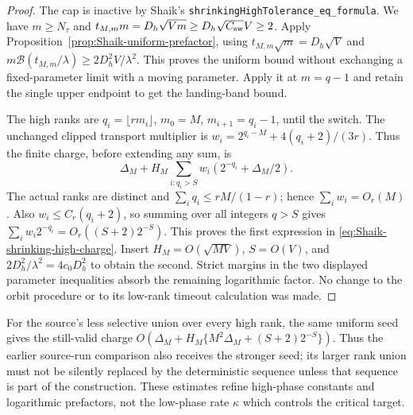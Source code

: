 \begin{proof}
The cap is inactive by Shaik's
\texttt{shrinkingHighTolerance\_eq\_formula}.
We have \(m\ge N_\tau\) and
\(t_{M,m}m=D_h\sqrt{Vm}\ge D_h\sqrt{C_{\rm sw}}V\ge2\).
Apply Proposition~\ref{prop:Shaik-uniform-prefactor}, using
\(t_{M,m}\sqrt m=D_h\sqrt V\) and
\(m\mathcal B(t_{M,m}/\lambda)\ge2D_h^2V/\lambda^2\).
This proves the uniform bound without exchanging a fixed-parameter
limit with a moving parameter. Apply it at \(m=q-1\) and retain the
single upper endpoint to get the landing-band bound.

The high ranks are \(q_i=\lfloor rm_i\rfloor\),
\(m_0=M\), \(m_{i+1}=q_i-1\), until the switch.
The unchanged clipped transport multiplier is
\(w_i=2^{q_i-M}+4(q_i+2)/(3r)\).
Thus the finite charge, before extending any sum, is
\[
 \Delta_M+
 H_M\sum_{i:q_i>S}w_i(2^{-q_i}+\Delta_M/2).
\]
The actual ranks are distinct and \(\sum_iq_i\le rM/(1-r)\);
hence \(\sum_iw_i=O_r(M)\).
Also \(w_i\le C_r(q_i+2)\), so summing over all integers \(q>S\)
gives \(\sum_iw_i2^{-q_i}=O_r((S+2)2^{-S})\).
This proves the first expression in
\eqref{eq:Shaik-shrinking-high-charge}.
Insert \(H_M=O(\sqrt{MV})\), \(S=O(V)\), and
\(2D_h^2/\lambda^2=4c_0D_h^2\) to obtain the second.
Strict margins in the two displayed parameter inequalities absorb
the remaining logarithmic factor. No change to the orbit procedure
or to its low-rank timeout calculation was made.
\end{proof}

For the source's less selective union over every high rank, the same
uniform seed gives the still-valid charge
\(O(\Delta_M+H_M\{M^2\Delta_M+(S+2)2^{-S}\})\).
Thus the earlier source-run comparison also receives the stronger seed;
its larger rank union must not be silently replaced by the deterministic
sequence unless that sequence is part of the construction.
These estimates refine high-phase constants and logarithmic prefactors,
not the low-phase rate \(\kappa\) which controls the critical target.

